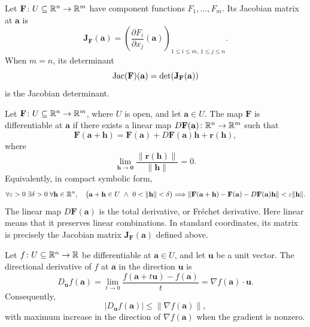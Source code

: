     \begin{definition}
        Let $\mathbf{F}\colon U\subseteq\mathbb{R}^n\to\mathbb{R}^m$ have component functions
        $F_1,\dots,F_m$. Its Jacobian matrix at $\mathbf{a}$ is
        \[
            \mathbf{J}_{\mathbf{F}}(\mathbf{a})
            =
            \left(\frac{\partial F_i}{\partial x_j}(\mathbf{a})\right)
            _{1\leq i\leq m,\,1\leq j\leq n}.
        \]
        When $m=n$, its determinant
        \[
            \operatorname{Jac}(\mathbf{F})(\mathbf{a})
            =
            \det\!\left(\mathbf{J}_{\mathbf{F}}(\mathbf{a})\right)
        \]
        is the Jacobian determinant.
    \end{definition}

    \begin{definition}
        Let $\mathbf{F}\colon U\subseteq\mathbb{R}^n\to\mathbb{R}^m$, where $U$ is open, and
        let $\mathbf{a}\in U$. The map $\mathbf{F}$ is differentiable at
        $\mathbf{a}$ if there exists a linear map
        $D\mathbf{F}(\mathbf{a})\colon\mathbb{R}^n\to\mathbb{R}^m$ such that
        \[
            \mathbf{F}(\mathbf{a}+\mathbf{h})
            =
            \mathbf{F}(\mathbf{a})
            +D\mathbf{F}(\mathbf{a})\mathbf{h}
            +\mathbf{r}(\mathbf{h}),
        \]
        where
        \[
            \lim\limits_{\mathbf{h}\to\mathbf{0}}
            \frac{\|\mathbf{r}(\mathbf{h})\|}{\|\mathbf{h}\|}
            =0.
        \]
        Equivalently, in compact symbolic form,
        {\small
        \[
            \forall\varepsilon>0\;\exists\delta>0\;\forall\mathbf{h}\in\R^n,
            \quad
            \bigl(\mathbf{a}+\mathbf{h}\in U\ \land\ 0<\|\mathbf{h}\|<\delta\bigr)
            \Longrightarrow
            \|\mathbf{F}(\mathbf{a}+\mathbf{h})-\mathbf{F}(\mathbf{a})
            -D\mathbf{F}(\mathbf{a})\mathbf{h}\|<\varepsilon\|\mathbf{h}\|.
        \]
        }
        The linear map $D\mathbf{F}(\mathbf{a})$ is the total derivative, or
        Fr\'echet derivative. Here linear means that it preserves linear
        combinations. In standard coordinates, its matrix is precisely the
        Jacobian matrix $\mathbf{J}_{\mathbf{F}}(\mathbf{a})$ defined above.
    \end{definition}


    \begin{definition}
        Let $f\colon U\subseteq\mathbb{R}^n\to\mathbb{R}$ be differentiable at
        $\mathbf{a}\in U$, and let $\mathbf{u}$ be a unit vector. The
        directional derivative of $f$ at $\mathbf{a}$ in the direction
        $\mathbf{u}$ is
        \[
            D_{\mathbf{u}}f(\mathbf{a})
            =
            \lim\limits_{t\to0}
            \frac{f(\mathbf{a}+t\mathbf{u})-f(\mathbf{a})}{t}
            =
            \nabla f(\mathbf{a})\cdot\mathbf{u}.
        \]
        Consequently,
        \[
            |D_{\mathbf{u}}f(\mathbf{a})|
            \leq
            \|\nabla f(\mathbf{a})\|,
        \]
        with maximum increase in the direction of
        $\nabla f(\mathbf{a})$ when the gradient is nonzero.
    \end{definition}

